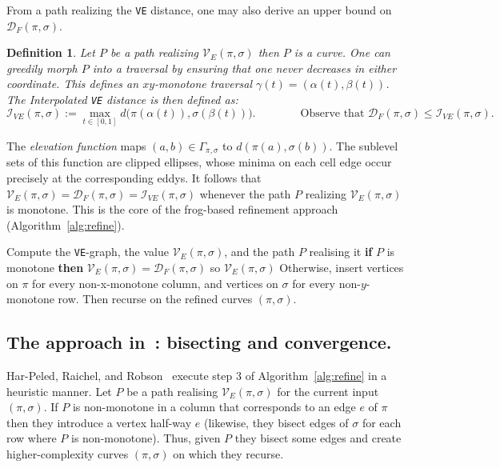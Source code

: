 \documentclass[10pt,a4paper]{article}
\newtheorem{definition}[theorem]{Definition}
\newcommand{\fd}{\mathcal{D}_F}
\newcommand{\ve}{\mathcal{V}_E}
\newcommand{\ive}{\mathcal{I}_{VE}}
\begin{document}
\noindent
From a path realizing the \texttt{VE} distance, one may also derive an upper bound on $\fd(\pi, \sigma)$.

\begin{definition}
    Let $P$ be a path realizing $\ve(\pi,\sigma)$ then $P$ is a curve. One can greedily morph $P$ into a traversal by ensuring that one never decreases in either coordinate. This defines an $xy$-monotone traversal $\gamma(t) = (\alpha(t), \beta(t))$.
    The \emph{Interpolated \texttt{VE} distance} is then defined as:
    \[
        \ive(\pi, \sigma)
        := \max_{t \in [0,1]} d\bigl(\pi(\alpha(t)), \sigma(\beta(t))\bigr).
        \qquad\qquad
        \text{Observe that } \fd(\pi,\sigma) \le \ive(\pi,\sigma).
    \]
\end{definition}

The \emph{elevation function} maps $(a,b) \in \Gamma_{\pi, \sigma}$ to $d(\pi(a), 
\sigma(b))$.
The sublevel sets of this function are clipped ellipses, whose minima on each cell edge occur precisely at the corresponding eddys.
It follows that $\ve(\pi,\sigma) = \fd(\pi, \sigma) = \ive(\pi, \sigma) $ whenever the path $P$ realizing $\ve(\pi,\sigma)$ is monotone.
This is the core of the frog-based refinement approach (Algorithm~\ref{alg:refine}).


\begin{algorithm}[H]
\caption{Refinement Procedure from~\cite{harpeled_et_al:LIPIcs.SoCG.2025.54}}
\label{alg:refine}
\begin{algorithmic}[1]
  \State Compute the \texttt{VE}-graph, the value $\ve(\pi,\sigma)$, and the path $P$ realising it
  \State \textbf{if} $P$ is monotone \textbf{then} $\ve(\pi,\sigma) = \fd(\pi, \sigma)$ so \Return $\ve(\pi,\sigma)$
  \State Otherwise, insert vertices on $\pi$ for every non-x-monotone column, and vertices on $\sigma$ for every non-$y$-monotone row. Then recurse on the refined curves $(\pi,\sigma)$.
\end{algorithmic}
\end{algorithm}

\subsection{The approach in~\cite{harpeled_et_al:LIPIcs.SoCG.2025.54}: bisecting and convergence.}
Har-Peled, Raichel, and Robson~\cite{harpeled_et_al:LIPIcs.SoCG.2025.54} execute step 3 of Algorithm~\ref{alg:refine} in a heuristic manner.  
Let $P$ be a path realising $\ve(\pi, \sigma)$ for the current input $(\pi, \sigma)$. 
If $P$ is non-monotone in a column that corresponds to an edge $e$ of $\pi$ then they introduce a vertex half-way $e$ (likewise, they bisect edges of $\sigma$ for each row where $P$ is non-monotone). 
Thus, given $P$ they bisect some edges and create higher-complexity curves $(\pi, \sigma)$ on which they recurse.
\end{document}
